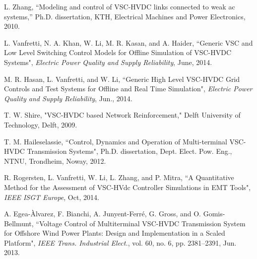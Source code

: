 \documentclass[conference]{IEEEtran}
\begin{document}

%
%
%
\begin{thebibliography}{1}

L. Zhang, ``Modeling and control of VSC-HVDC links connected to weak ac systems,” Ph.D. dissertation, KTH, Electrical Machines and Power Electronics, 2010.

L. Vanfretti, N. A. Khan, W. Li, M. R. Kasan, and A. Haider, ``Generic VSC and Low Level Switching Control Models for Offline Simulation of VSC-HVDC Systems", {\em Electric Power Quality and Supply Reliability}, June, 2014.

M. R. Hasan, L. Vanfretti, and W. Li, ``Generic High Level VSC-HVDC Grid Controls and Test Systems for Offline and Real Time Simulation", {\em Electric Power Quality and Supply Reliability}, Jun., 2014.

T. W. Shire, "VSC-HVDC based Network Reinforcement," Delft University of Technology, Delft, 2009.

T. M. Haileselassie, ``Control, Dynamics and Operation of Multi-terminal VSC-HVDC Transmission Systems", Ph.D. dissertation, Dept. Elect. Pow. Eng., NTNU, Trondheim, Noway, 2012. 



R. Rogersten, L. Vanfretti, W. Li, L. Zhang, and P. Mitra, ``A Quantitative Method for the Assessment of
VSC-HVdc Controller Simulations in EMT Tools", {\em IEEE ISGT Europe}, Oct, 2014.

A. Egea-\`{A}lvarez, F. Bianchi, A. Junyent-Ferr\'{e}, G. Gross, and O. Gomis-Bellmunt, ``Voltage Control of Multiterminal VSC-HVDC Transmission System for Offshore Wind Power Plants: Design and Implementation in a Scaled Platform", {\em IEEE Trans. Industrial Elect.}, vol. 60, no. 6, pp. 2381–2391, Jun. 2013.


\end{thebibliography}




\end{document}
